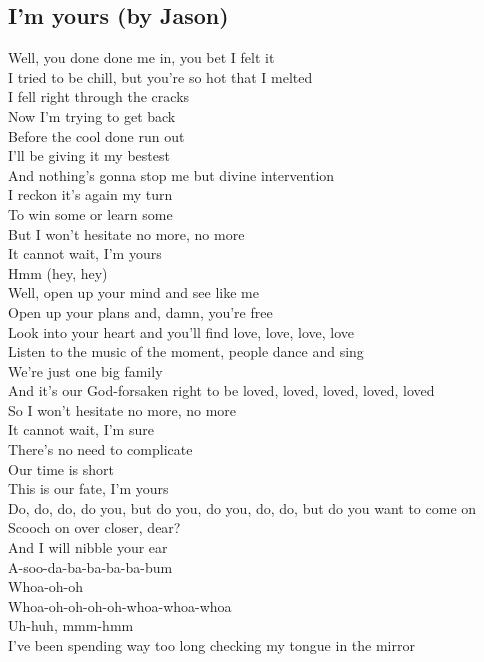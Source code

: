 \documentclass[]{article} %
\begin{document}
\thispagestyle{headings}
\subsection*{I'm yours (by Jason)}
Well, you done done me in, you bet I felt it\\
I tried to be chill, but you're so hot that I melted\\
I fell right through the cracks\\
Now I'm trying to get back\\
Before the cool done run out\\
I'll be giving it my bestest\\
And nothing's gonna stop me but divine intervention\\
I reckon it's again my turn\\
To win some or learn some\\
But I won't hesitate no more, no more\\
It cannot wait, I'm yours\\
Hmm (hey, hey)\\
Well, open up your mind and see like me\\
Open up your plans and, damn, you're free\\
Look into your heart and you'll find love, love, love, love\\
Listen to the music of the moment, people dance and sing\\
We're just one big family\\
And it's our God-forsaken right to be loved, loved, loved, loved, loved\\
So I won't hesitate no more, no more\\
It cannot wait, I'm sure\\
There's no need to complicate\\
Our time is short\\
This is our fate, I'm yours\\
Do, do, do, do you, but do you, do you, do, do, but do you want to come on\\
Scooch on over closer, dear?\\
And I will nibble your ear\\
A-soo-da-ba-ba-ba-ba-bum\\
Whoa-oh-oh\\
Whoa-oh-oh-oh-oh-whoa-whoa-whoa\\
Uh-huh, mmm-hmm\\
I've been spending way too long checking my tongue in the mirror\\
\end{document}
